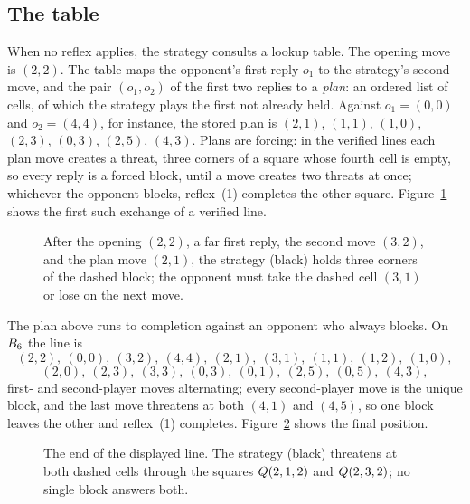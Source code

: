 \documentclass[11pt]{amsart}
\theoremstyle{definition}
\theoremstyle{remark}
\begin{document}
\subsection{The table}
When no reflex applies, the strategy consults a lookup table. The
opening move is $(2,2)$. The table maps the opponent's first reply
$o_1$ to the strategy's second move, and the pair $(o_1, o_2)$ of the first two
replies to a \emph{plan}: an ordered list of cells, of which the
strategy plays the first not already held. Against $o_1 = (0,0)$ and
$o_2 = (4,4)$, for instance, the stored plan is $(2,1)$, $(1,1)$,
$(1,0)$, $(2,3)$, $(0,3)$, $(2,5)$, $(4,3)$. Plans are forcing: in the
verified lines each plan move creates a threat, three corners of a
square whose fourth cell is empty, so every reply is a forced block,
until a move creates two threats at once; whichever the opponent
blocks, reflex~(1) completes the other square.
Figure~\ref{fig:forcing} shows the first such exchange of a verified
line.

\begin{figure}[ht]
\centering
{}
\caption{After the opening $(2,2)$, a far first reply, the second move
$(3,2)$, and the plan move $(2,1)$, the strategy (black) holds three corners
of the dashed block; the opponent must take the dashed cell $(3,1)$ or
lose on the next move.}
\label{fig:forcing}
\end{figure}

The plan above runs to completion against an opponent who always
blocks. On $B_6$ the line is
\[
  (2,2),\ (0,0),\ (3,2),\ (4,4),\ (2,1),\ (3,1),\ (1,1),\ (1,2),\ (1,0),
\]
\[
  (2,0),\ (2,3),\ (3,3),\ (0,3),\ (0,1),\ (2,5),\ (0,5),\ (4,3),
\]
first- and second-player moves alternating; every second-player move
is the unique block, and the last move threatens at both $(4,1)$ and
$(4,5)$, so one block leaves the other and reflex~(1) completes.
Figure~\ref{fig:line} shows the final position.

\begin{figure}[ht]
\centering
{}
\caption{The end of the displayed line. The strategy (black) threatens
at both dashed cells through the squares $Q(2,1,2)$ and
$Q(2,3,2)$; no single block answers both.}
\label{fig:line}
\end{figure}
\end{document}
